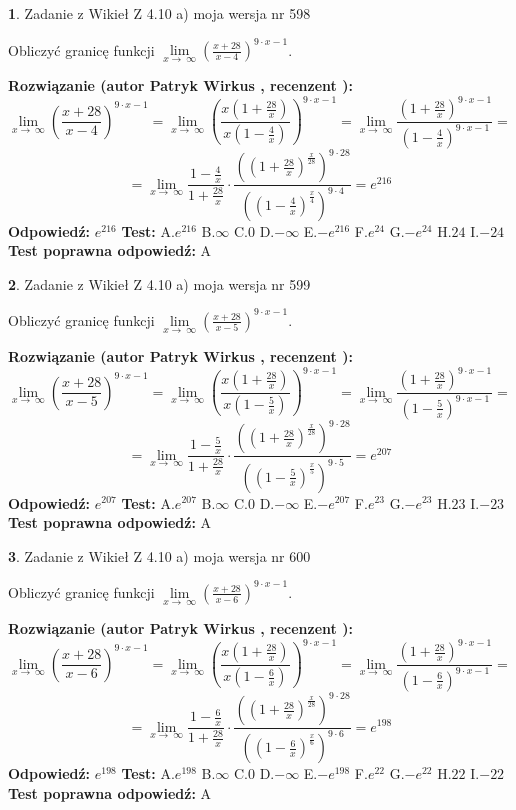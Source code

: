 \documentclass[12pt, a4paper]{article}
\theoremstyle{definition} %
\newtheorem{zad}{}
\newcommand{\zadStart}[1]{\begin{zad}#1\newline}
\newcommand{\zadStop}{\end{zad}}
\newcommand{\rozwStart}[2]{\noindent \textbf{Rozwiązanie (autor #1 , recenzent #2): }\newline}
\newcommand{\rozwStop}{\newline}
\newcommand{\odpStart}{\noindent \textbf{Odpowiedź:}\newline}
\newcommand{\odpStop}{\newline}
\newcommand{\testStart}{\noindent \textbf{Test:}\newline}
\newcommand{\testStop}{\newline}
\newcommand{\kluczStart}{\noindent \textbf{Test poprawna odpowiedź:}\newline}
\newcommand{\kluczStop}{\newline}
\begin{document}
\zadStart{Zadanie z Wikieł Z 4.10 a) moja wersja nr 598}

Obliczyć granicę funkcji  $\lim\limits_{x\to\ \infty}(\frac{x+28}{x-4})^{9\cdot x-1}$.
\zadStop
\rozwStart{Patryk Wirkus}{}
$$\lim\limits_{x\to\ \infty}(\frac{x+28}{x-4})^{9\cdot x-1} = \lim\limits_{x\to\ \infty}(\frac{x(1+\frac{28}{x})}{x(1-\frac{4}{x})})^{9\cdot x-1}=\lim\limits_{x\to\ \infty}\frac{(1+\frac{28}{x})^{9\cdot x-1}}{(1-\frac{4}{x})^{9\cdot x-1}}=$$
$$=\lim\limits_{x\to\ \infty}\frac{1-\frac{4}{x}}{1+\frac{28}{x}}\cdot\frac{((1+\frac{28}{x})^{\frac{x}{28}})^{9\cdot28}}{((1-\frac{4}{x})^{\frac{x}{4}})^{9\cdot4}}=e^{216}$$
\rozwStop
\odpStart
$e^{216}$
\odpStop
\testStart
A.$e^{216}$ B.$\infty$ C.$0$ D.$-\infty$ E.$-e^{216}$
F.$e^{24}$ G.$-e^{24}$
H.$24$
I.$-24$
\testStop
\kluczStart
A
\kluczStop



\zadStart{Zadanie z Wikieł Z 4.10 a) moja wersja nr 599}

Obliczyć granicę funkcji  $\lim\limits_{x\to\ \infty}(\frac{x+28}{x-5})^{9\cdot x-1}$.
\zadStop
\rozwStart{Patryk Wirkus}{}
$$\lim\limits_{x\to\ \infty}(\frac{x+28}{x-5})^{9\cdot x-1} = \lim\limits_{x\to\ \infty}(\frac{x(1+\frac{28}{x})}{x(1-\frac{5}{x})})^{9\cdot x-1}=\lim\limits_{x\to\ \infty}\frac{(1+\frac{28}{x})^{9\cdot x-1}}{(1-\frac{5}{x})^{9\cdot x-1}}=$$
$$=\lim\limits_{x\to\ \infty}\frac{1-\frac{5}{x}}{1+\frac{28}{x}}\cdot\frac{((1+\frac{28}{x})^{\frac{x}{28}})^{9\cdot28}}{((1-\frac{5}{x})^{\frac{x}{5}})^{9\cdot5}}=e^{207}$$
\rozwStop
\odpStart
$e^{207}$
\odpStop
\testStart
A.$e^{207}$ B.$\infty$ C.$0$ D.$-\infty$ E.$-e^{207}$
F.$e^{23}$ G.$-e^{23}$
H.$23$
I.$-23$
\testStop
\kluczStart
A
\kluczStop



\zadStart{Zadanie z Wikieł Z 4.10 a) moja wersja nr 600}

Obliczyć granicę funkcji  $\lim\limits_{x\to\ \infty}(\frac{x+28}{x-6})^{9\cdot x-1}$.
\zadStop
\rozwStart{Patryk Wirkus}{}
$$\lim\limits_{x\to\ \infty}(\frac{x+28}{x-6})^{9\cdot x-1} = \lim\limits_{x\to\ \infty}(\frac{x(1+\frac{28}{x})}{x(1-\frac{6}{x})})^{9\cdot x-1}=\lim\limits_{x\to\ \infty}\frac{(1+\frac{28}{x})^{9\cdot x-1}}{(1-\frac{6}{x})^{9\cdot x-1}}=$$
$$=\lim\limits_{x\to\ \infty}\frac{1-\frac{6}{x}}{1+\frac{28}{x}}\cdot\frac{((1+\frac{28}{x})^{\frac{x}{28}})^{9\cdot28}}{((1-\frac{6}{x})^{\frac{x}{6}})^{9\cdot6}}=e^{198}$$
\rozwStop
\odpStart
$e^{198}$
\odpStop
\testStart
A.$e^{198}$ B.$\infty$ C.$0$ D.$-\infty$ E.$-e^{198}$
F.$e^{22}$ G.$-e^{22}$
H.$22$
I.$-22$
\testStop
\kluczStart
A
\kluczStop
\end{document}
